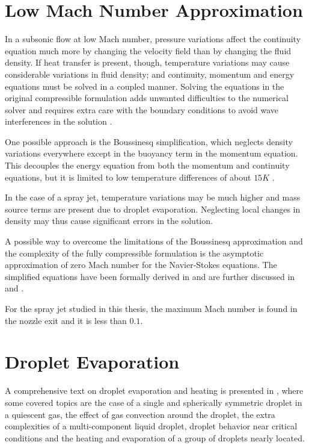 \section{Low Mach Number Approximation}

In a subsonic flow at low Mach number, pressure variations affect the continuity equation much more by changing the velocity field than by changing the fluid density. If heat transfer is present, though, temperature variations may cause considerable variations in fluid density; and continuity, momentum and energy equations must be solved in a coupled manner. Solving the equations in the original compressible formulation adds unwanted difficulties to the numerical solver and requires extra care with the boundary conditions to avoid wave interferences in the solution \cite{poinsot2005theoretical}.

One possible approach is the Boussinesq simplification, which neglects density variations everywhere except in the buoyancy term in the momentum equation. This decouples the energy equation from both the momentum and continuity equations, but it is limited to low temperature differences of about $15K$ \cite{ferziger}.

In the case of a spray jet, temperature variations may be much higher and mass source terms are present due to droplet evaporation. Neglecting local changes in density may thus cause significant errors in the solution.

A possible way to overcome the limitations of the Boussinesq approximation and the complexity of the fully compressible formulation is the asymptotic approximation of zero Mach number for the Navier-Stokes equations. The simplified equations have been formally derived in \cite{majda} and are further discussed in \cite{muller1999low} and \cite{viozat1997implicit}.

For the spray jet studied in this thesis, the maximum Mach number is found in the nozzle exit and it is less than $0.1$.

\section{Droplet Evaporation}

A comprehensive text on droplet evaporation and heating is presented in \cite{sirignano}, where some covered topics are the case of a single and spherically symmetric droplet in a quiescent gas, the effect of gas convection around the droplet, the extra complexities of a multi-component liquid droplet, droplet behavior near critical conditions and the heating and evaporation of a group of droplets nearly located.

